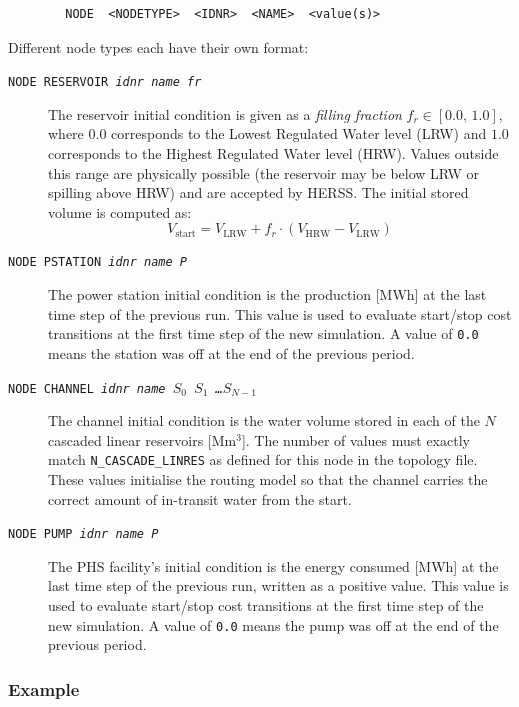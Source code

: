 \documentclass[a4paper, 12pt]{report}
\begin{document}
	\begin{verbatim}
		NODE  <NODETYPE>  <IDNR>  <NAME>  <value(s)>
	\end{verbatim}
	
	Different node types each have their own format:
	
	\begin{description}
		\item[\texttt{NODE RESERVOIR \textnormal{\textit{idnr name fr}}}]
		The reservoir initial condition is given as a \emph{filling fraction}
		$f_r \in [0.0,\, 1.0]$, where $0.0$ corresponds to the Lowest Regulated Water
		level (LRW) and $1.0$ corresponds to the Highest Regulated Water level (HRW).
		Values outside this range are physically possible (the reservoir may be below LRW
		or spilling above HRW) and are accepted by HERSS. The initial stored volume is
		computed as:
		\[
		V_\mathrm{start} = V_\mathrm{LRW} + f_r \cdot (V_\mathrm{HRW} - V_\mathrm{LRW})
		\]
		
		\item[\texttt{NODE PSTATION \textnormal{\textit{idnr name P}}}]
		The power station initial condition is the production [MWh] at the last time step
		of the previous run. This value is used to evaluate start/stop cost transitions
		at the first time step of the new simulation. A value of \texttt{0.0} means the
		station was off at the end of the previous period.
		
		\item[\texttt{NODE CHANNEL \textnormal{\textit{idnr name $S_0$ $S_1$ \ldots $S_{N-1}$}}}]
		The channel initial condition is the water volume stored in each of the $N$
		cascaded linear reservoirs [Mm$^3$]. The number of values must exactly match
		\texttt{N\_CASCADE\_LINRES} as defined for this node in the topology file.
		These values initialise the routing model so that the channel carries the correct
		amount of in-transit water from the start.

        \item[\texttt{NODE PUMP \textnormal{\textit{idnr name P}}}] The PHS facility's initial condition is the energy consumed [MWh] at the last time step
		of the previous run, written as a positive value. This value is used to evaluate start/stop cost transitions
		at the first time step of the new simulation. A value of \texttt{0.0} means the pump was off at the end of the previous period.  
	\end{description}
	
	\subsubsection{Example}
	
\end{document}
